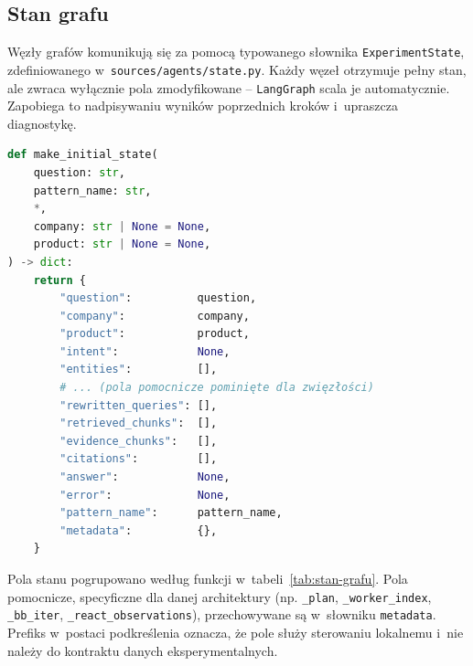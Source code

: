 \subsection{Stan grafu}\label{subsec:stan-grafu}

Węzły grafów komunikują się za pomocą typowanego słownika
\texttt{ExperimentState}, zdefiniowanego w~\texttt{sources/agents/state.py}.
Każdy węzeł otrzymuje pełny stan, ale zwraca wyłącznie pola zmodyfikowane --
\texttt{LangGraph} scala je automatycznie. Zapobiega to nadpisywaniu wyników
poprzednich kroków i~upraszcza diagnostykę.

\begin{lstlisting}[language=Python,
  caption={Inicjalizacja stanu grafu},
  label={lst:inicjalizacja-stanu-grafu}]
def make_initial_state(
    question: str,
    pattern_name: str,
    *,
    company: str | None = None,
    product: str | None = None,
) -> dict:
    return {
        "question":          question,
        "company":           company,
        "product":           product,
        "intent":            None,
        "entities":          [],
        # ... (pola pomocnicze pominięte dla zwięzłości)
        "rewritten_queries": [],
        "retrieved_chunks":  [],
        "evidence_chunks":   [],
        "citations":         [],
        "answer":            None,
        "error":             None,
        "pattern_name":      pattern_name,
        "metadata":          {},
    }
\end{lstlisting}

Pola stanu pogrupowano według funkcji w~tabeli~\ref{tab:stan-grafu}. Pola
pomocnicze, specyficzne dla danej architektury (np. \texttt{\_plan},
\texttt{\_worker\_index}, \texttt{\_bb\_iter}, \texttt{\_react\_observations}),
przechowywane są w~słowniku \texttt{metadata}. Prefiks w~postaci podkreślenia
oznacza, że pole służy sterowaniu lokalnemu i~nie należy do kontraktu danych
eksperymentalnych.

